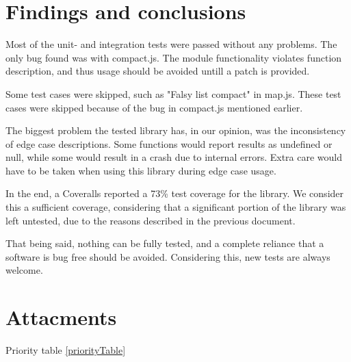 \documentclass[a4paper, 12pt]{article}
\begin{document}
		
		

\newpage

\section{Findings and conclusions}

Most of the unit- and integration tests were passed without any problems. The only bug found was with compact.js. 
The module functionality violates function description, and thus usage should be avoided untill a patch is provided.

\vspace{5mm}

Some test cases were skipped, such as "Falsy list compact" in map.js. These test cases were skipped because of the bug in compact.js mentioned earlier. 

\vspace{5mm}

The biggest problem the tested library has, in our opinion, was the inconsistency of edge case descriptions. Some functions 
would report results as undefined or null, while some would result in a crash due to internal errors. Extra care would have to be taken when using this library during edge case usage.

\vspace{5mm}

In the end, a Coveralls reported a 73\% test coverage for the library. We consider this a sufficient coverage, considering that a significant portion of the library was left untested, due to the reasons described in the previous document. 

\vspace{5mm}

That being said, nothing can be fully tested, and a complete reliance that a software is bug free should be avoided. Considering this, new tests are always welcome.









\section*{Attacments}

Priority table \ref{priorityTable}
\end{document}
